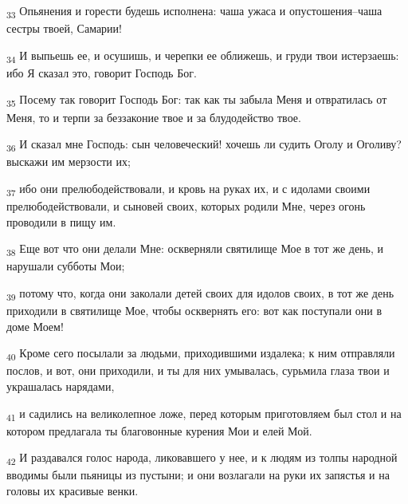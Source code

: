 \begin{tcolorbox}
\textsubscript{33} Опьянения и горести будешь исполнена: чаша ужаса и опустошения--чаша сестры твоей, Самарии!
\end{tcolorbox}
\begin{tcolorbox}
\textsubscript{34} И выпьешь ее, и осушишь, и черепки ее оближешь, и груди твои истерзаешь: ибо Я сказал это, говорит Господь Бог.
\end{tcolorbox}
\begin{tcolorbox}
\textsubscript{35} Посему так говорит Господь Бог: так как ты забыла Меня и отвратилась от Меня, то и терпи за беззаконие твое и за блудодейство твое.
\end{tcolorbox}
\begin{tcolorbox}
\textsubscript{36} И сказал мне Господь: сын человеческий! хочешь ли судить Оголу и Оголиву? выскажи им мерзости их;
\end{tcolorbox}
\begin{tcolorbox}
\textsubscript{37} ибо они прелюбодействовали, и кровь на руках их, и с идолами своими прелюбодействовали, и сыновей своих, которых родили Мне, через огонь проводили в пищу им.
\end{tcolorbox}
\begin{tcolorbox}
\textsubscript{38} Еще вот что они делали Мне: оскверняли святилище Мое в тот же день, и нарушали субботы Мои;
\end{tcolorbox}
\begin{tcolorbox}
\textsubscript{39} потому что, когда они заколали детей своих для идолов своих, в тот же день приходили в святилище Мое, чтобы осквернять его: вот как поступали они в доме Моем!
\end{tcolorbox}
\begin{tcolorbox}
\textsubscript{40} Кроме сего посылали за людьми, приходившими издалека; к ним отправляли послов, и вот, они приходили, и ты для них умывалась, сурьмила глаза твои и украшалась нарядами,
\end{tcolorbox}
\begin{tcolorbox}
\textsubscript{41} и садились на великолепное ложе, перед которым приготовляем был стол и на котором предлагала ты благовонные курения Мои и елей Мой.
\end{tcolorbox}
\begin{tcolorbox}
\textsubscript{42} И раздавался голос народа, ликовавшего у нее, и к людям из толпы народной вводимы были пьяницы из пустыни; и они возлагали на руки их запястья и на головы их красивые венки.
\end{tcolorbox}
